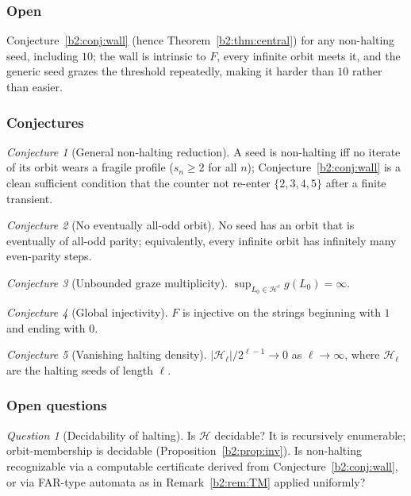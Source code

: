 \documentclass[a4paper]{article}
\theoremstyle{plain}
\theoremstyle{definition}
\theoremstyle{remark}
\newtheorem{conjecture}{Conjecture}[subsection]
\newtheorem{question}{Question}[subsection]
\begin{document}
\subsubsection*{Open} Conjecture~\ref{b2:conj:wall} (hence Theorem~\ref{b2:thm:central}) for any non-halting seed, including $10$; the wall is intrinsic to $F$, every infinite orbit meets it, and the generic seed grazes the threshold repeatedly, making it harder than $10$ rather than easier.

\subsubsection{Conjectures}\label{b2:sec:conj}
\begin{conjecture}[General non-halting reduction]\label{b2:conj:reduction}
A seed is non-halting iff no iterate of its orbit wears a fragile profile ($s_n\ge 2$ for all $n$); Conjecture~\ref{b2:conj:wall} is a clean sufficient condition that the counter not re-enter $\{2,3,4,5\}$ after a finite transient.
\end{conjecture}

\begin{conjecture}[No eventually all-odd orbit]\label{b2:conj:noallodd}
No seed has an orbit that is eventually of all-odd parity; equivalently, every infinite orbit has infinitely many even-parity steps.
\end{conjecture}

\begin{conjecture}[Unbounded graze multiplicity]\label{b2:conj:graze}
$\sup_{L_0\in\mathcal H^c} g(L_0)=\infty$.
\end{conjecture}

\begin{conjecture}[Global injectivity]\label{b2:conj:inj}
$F$ is injective on the strings beginning with $1$ and ending with $0$.
\end{conjecture}

\begin{conjecture}[Vanishing halting density]\label{b2:conj:density}
$|\mathcal H_\ell|/2^{\ell-1}\to 0$ as $\ell\to\infty$, where $\mathcal H_\ell$ are the halting seeds of length $\ell$.
\end{conjecture}

\subsubsection{Open questions}\label{b2:sec:open}
\begin{question}[Decidability of halting]\label{b2:q:dec}
Is $\mathcal H$ decidable? It is recursively enumerable; orbit-membership is decidable (Proposition~\ref{b2:prop:inv}). Is non-halting recognizable via a computable certificate derived from Conjecture~\ref{b2:conj:wall}, or via FAR-type automata as in Remark~\ref{b2:rem:TM} applied uniformly?
\end{question}
\end{document}
